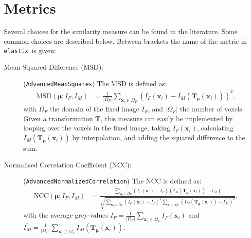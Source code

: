 \documentclass[]{report}
\newcommand{\elastix}{\texttt{elastix}}
\newcommand{\vx}{\bm{x}}
\newcommand{\vmu}{\bm{\mu}}
\newcommand{\vT}{\bm{T}}
\newcommand{\vTm}{\bm{T}_{\vmu}}
\begin{document}
\section{Metrics}\label{sec:comp:metric}

Several choices for the similarity measure can be found in the
literature. Some common choices are described below. Between brackets
the name of the metric in \elastix\ is given:

\begin{description}
\item[Mean Squared Difference (MSD):] (\texttt{AdvancedMeanSquares})
The MSD is defined as:
\begin{align}
\mathrm{MSD}(\vmu;I_F,I_M) &= \frac{1}{|\Omega_F|}
\sum\limits_{\vx_i \in \Omega_F} \left( I_F(\vx_i) -
I_M(\vT_{\vmu}(\vx_i)) \right)^2,\label{eq:ssd}
\end{align}
with $\Omega_F$ the domain of the fixed image $I_F$, and
$|\Omega_F|$ the number of voxels. Given a transformation $\vT$,
this measure can easily be implemented by looping over the voxels
in the fixed image, taking $I_F(\vx_i)$, calculating
$I_M(\vT_{\vmu}(\vx_i))$ by interpolation, and adding the squared
difference to the sum.

\item[Normalised Correlation Coefficient (NCC):]
(\texttt{AdvancedNormalizedCorrelation}) The NCC is defined as:
\begin{align}
\mathrm{NCC}(\vmu;I_F,I_M) &= \frac{ \sum\limits_{\vx_i \in \Omega_F}
\left( I_F(\vx_i) - \overline{I_F} \right) \left( I_M(\vTm(\vx_i)) -
\overline{I_M} \right) }{ \sqrt{\sum\limits_{\vx_i \in \Omega_F}
\left( I_F(\vx_i) - \overline{I_F} \right)^2 \sum\limits_{\vx_i \in
\Omega_F} \left( I_M(\vTm(\vx_i)) - \overline{I_M} \right)^2}
},\label{eq:ncc}
\end{align}
with the average grey-values
$\overline{I_F}=\frac{1}{|\Omega_F|}\sum\limits_{\vx_i \in
\Omega_F} I_F(\vx_i)$ and
$\overline{I_M}=\frac{1}{|\Omega_F|}\sum\limits_{\vx_i \in
\Omega_F} I_M(\vT_{\vmu}(\vx_i))$.


\end{description}
\end{document}
